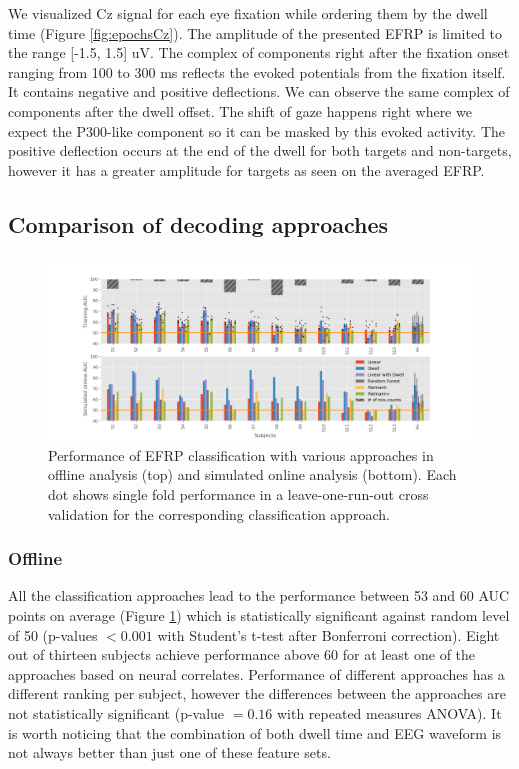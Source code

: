 \documentclass[12pt]{iopart}
\begin{document}
We visualized Cz signal for each eye fixation while ordering them
by the dwell time (Figure \ref{fig:epochsCz}).
The amplitude of the presented EFRP is limited to the range [-1.5, 1.5] uV.
The complex of components right after the fixation onset ranging from 100 to 300 ms
reflects the evoked potentials from the fixation itself. It contains
negative and positive deflections. We can observe the same complex of components
after the dwell offset. The shift of gaze happens right where we expect 
the P300-like component so it can be masked by this evoked activity.
The positive deflection occurs at the end of the dwell for both
targets and non-targets, however it has a greater amplitude for targets
as seen on the averaged EFRP.


\subsection{Comparison of decoding approaches}

\begin{figure}[!t]
    \includegraphics[trim={2cm 0cm 2cm 0cm},clip,width=1.1\columnwidth]{../images/ClassificationAll.png}
    \caption{Performance of EFRP classification with various approaches in offline analysis (top)
    and simulated online analysis (bottom). Each dot shows single fold performance
    in a leave-one-run-out cross validation for the corresponding classification approach.}
\label{fig:classAll}
\end{figure}

\subsubsection*{Offline}
All the classification approaches lead to the performance between 53 and 60 AUC points on average
(Figure \ref{fig:classAll})
which is statistically significant against random level of 50 
(p-values $< 0.001$ with Student's t-test after Bonferroni correction).
Eight out of thirteen subjects achieve performance above 60 for at least one of the approaches based
on neural correlates.
Performance of different approaches has a different ranking per subject, however
the differences between
the approaches are not statistically significant (p-value $= 0.16$ with repeated measures ANOVA).
It is worth noticing that the combination of both dwell time and EEG waveform is not always
better than just one of these feature sets.
\end{document}
